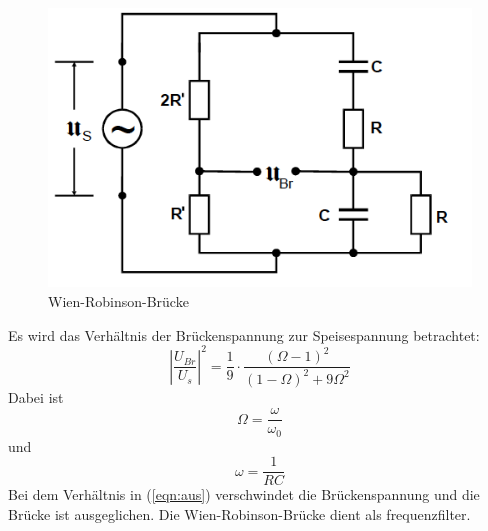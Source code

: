 \begin{figure}
  \centering
  \includegraphics[scale = 0.7]{Wien.PNG}
  \caption{Wien-Robinson-Brücke\protect\cite{on3}}
  \label{fig:wien}
\end{figure}
Es wird das Verhältnis der Brückenspannung zur Speisespannung betrachtet:
\begin{equation}
  \left|\frac{U_{Br}}{U_s}\right|^2 = \frac{1}{9}\cdot \frac{(\Omega - 1)^2}{(1- \Omega)^2 + 9\Omega ^2}
  \label{eqn:WiRo}
\end{equation}
Dabei ist
\begin{equation*}
  \Omega = \frac{\omega}{\omega_0}
\end{equation*}
und
\begin{equation}
  \omega = \frac{1}{RC}
  \label{eqn:aus}
\end{equation}
Bei dem Verhältnis in (\ref{eqn:aus}) verschwindet die Brückenspannung
und die Brücke ist ausgeglichen.
Die Wien-Robinson-Brücke dient als frequenzfilter.
